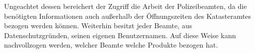 Ungeachtet dessen bereichert der Zugriff die Arbeit der Polizeibeamten, da die benötigten Informationen auch außerhalb der Öffnungszeiten des Katasteramtes bezogen werden können.
Weiterhin besitzt jeder Beamte, aus Datenschutzgründen, seinen eigenen Benutzernamen.
Auf diese Weise kann nachvollzogen werden, welcher Beamte welche Produkte bezogen hat.

%



